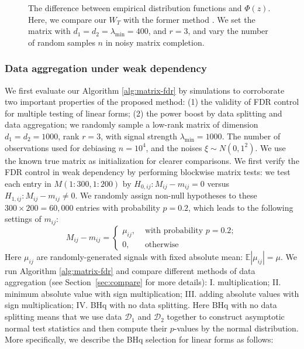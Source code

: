 \documentclass[12pt]{article}
\newcommand{\abs}[1]{\left\lvert#1\right\rvert}
\newcommand{\E}{\mathbb{E}}
\newcommand{\cD}{\mathcal{D}}
\theoremstyle{plain}
\begin{document}
\begin{sloppypar}
\begin{figure}[H]
 \caption{The difference between empirical distribution functions and $\Phi(z)$.  Here, we compare our $W_T$ with the former method \citep{xia2021statistical}. We set the matrix with $d_1=d_2=\lambda_{\min}=400$, and $r=3$, and vary the number of random samples $n$ in noisy matrix completion. }
 \label{fig:variance-comparison}
\end{figure}

\subsubsection{Data aggregation under weak dependency}
We first evaluate our Algorithm \ref{alg:matrix-fdr} by simulations to corroborate two important properties of the proposed method: (1) the validity of FDR control for multiple testing of linear forms; (2) the power boost by data splitting and data aggregation; we randomly sample a low-rank matrix of dimension $d_1=d_2=1000$, rank $r=3$, with signal strength $\lambda_{\min}=1000$. The number of observations used for debiasing $n=10^4$, and the noises $\xi\sim N(0,1^2)$. We use the known true matrix as initialization for clearer comparisons. We first verify the FDR control in weak dependency by performing blockwise matrix tests: we test each entry in $M(1:300,1:200)$ by $H_{0,ij}: M_{ij}-m_{ij}=0$ versus $H_{1,ij}: M_{ij}-m_{ij}\neq 0$. We randomly assign non-null hypotheses to these $300\times 200=60,000$ entries with probability $p=0.2$, which leads to the following settings of $m_{ij}$:
\begin{equation}\label{eq:construct_H0}
    M_{ij}-m_{ij}=\begin{cases}
        \mu_{ij}, & \text{ with probability } p=0.2 ;\\
         0, & \text{ otherwise }
    \end{cases}  
\end{equation}
Here $\mu_{ij}$ are randomly-generated signals with fixed absolute mean: $\E \abs{\mu_{ij}}=\mu$. We run Algorithm \ref{alg:matrix-fdr} and compare different methods of data aggregation (see Section~\ref{sec:compare} for more details): I. multiplication; II. minimum absolute value with sign multiplication; III. adding absolute values with sign multiplication; IV. BHq with no data splitting. Here BHq with no data splitting means that we use data $\cD_1$ and $\cD_2$ together to construct asymptotic normal test statistics and then compute their $p$-values by the normal distribution. More specifically, we describe the BHq selection for linear forms as follows:
\begin{enumerate}

\end{enumerate}
\end{sloppypar}
\end{document}
